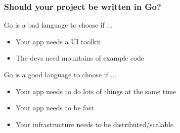 \documentclass{beamer}
\begin{document}
\begin{frame}
  \frametitle{Should your project be written in Go?}
  Go is a bad language to choose if ...
  \begin{itemize}
    \item Your app needs a UI toolkit
    \item The devs need mountains of example code
  \end{itemize}
  \bigskip
  Go is a good language to choose if ...
  \begin{itemize}
    \item Your app needs to do lots of things at the same time
    \item Your app needs to be fast
    \item Your infrastructure needs to be distributed/scalable
  \end{itemize}
\end{frame}
\end{document}
